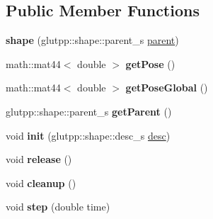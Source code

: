 \subsection*{\-Public \-Member \-Functions}
\begin{DoxyCompactItemize}
\item 
\hypertarget{classglutpp_1_1shape_1_1shape_af33c4417a03c151603a0be870fc294c6}{{\bfseries shape} (glutpp\-::shape\-::parent\-\_\-s \hyperlink{classglutpp_1_1shape_1_1parent}{parent})}\label{classglutpp_1_1shape_1_1shape_af33c4417a03c151603a0be870fc294c6}

\item 
\hypertarget{classglutpp_1_1shape_1_1shape_a66cb8e0a10a35d7a507ad8acfb236f91}{math\-::mat44$<$ double $>$ {\bfseries get\-Pose} ()}\label{classglutpp_1_1shape_1_1shape_a66cb8e0a10a35d7a507ad8acfb236f91}

\item 
\hypertarget{classglutpp_1_1shape_1_1shape_a4725bfab634f98e0e347e344c6216038}{math\-::mat44$<$ double $>$ {\bfseries get\-Pose\-Global} ()}\label{classglutpp_1_1shape_1_1shape_a4725bfab634f98e0e347e344c6216038}

\item 
\hypertarget{classglutpp_1_1shape_1_1shape_a4d68e601145d5e5479ec360748aa201a}{glutpp\-::shape\-::parent\-\_\-s {\bfseries get\-Parent} ()}\label{classglutpp_1_1shape_1_1shape_a4d68e601145d5e5479ec360748aa201a}

\item 
\hypertarget{classglutpp_1_1shape_1_1shape_a7d25094ffd1119b04797289d1a3da851}{void {\bfseries init} (glutpp\-::shape\-::desc\-\_\-s \hyperlink{classglutpp_1_1shape_1_1desc}{desc})}\label{classglutpp_1_1shape_1_1shape_a7d25094ffd1119b04797289d1a3da851}

\item 
\hypertarget{classglutpp_1_1shape_1_1shape_a7788abfe661a5fd92c93e2081e1d72e7}{void {\bfseries release} ()}\label{classglutpp_1_1shape_1_1shape_a7788abfe661a5fd92c93e2081e1d72e7}

\item 
\hypertarget{classglutpp_1_1shape_1_1shape_ac4c6568d96e8b0701e6c161f99e27be3}{void {\bfseries cleanup} ()}\label{classglutpp_1_1shape_1_1shape_ac4c6568d96e8b0701e6c161f99e27be3}

\item 
\hypertarget{classglutpp_1_1shape_1_1shape_a510a7f5698283d60203f3e436dbf5437}{void {\bfseries step} (double time)}\label{classglutpp_1_1shape_1_1shape_a510a7f5698283d60203f3e436dbf5437}


\end{DoxyCompactItemize}
